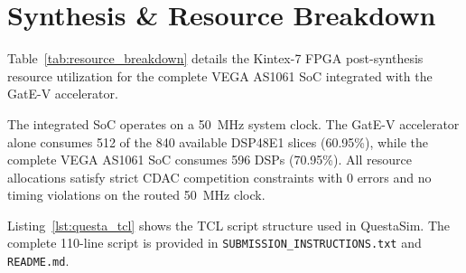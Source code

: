\documentclass[10pt,journal,compsoc,twocolumn]{IEEEtran}
\begin{document}
\newpage

\section{Synthesis \& Resource Breakdown}
Table~\ref{tab:resource_breakdown} details the Kintex-7 FPGA post-synthesis resource utilization for the complete VEGA AS1061 SoC integrated with the GatE-V accelerator.

\begin{table}[htbp]
\caption{Kintex-7 (\texttt{xc7k325tffg900-2}) Resource Utilization}
\label{tab:resource_breakdown}
\centering
{}
\end{table}

The integrated SoC operates on a 50~MHz system clock. The GatE-V accelerator alone consumes 512 of the 840 available DSP48E1 slices (60.95\%), while the complete VEGA AS1061 SoC consumes 596 DSPs (70.95\%). All resource allocations satisfy strict CDAC competition constraints with 0 errors and no timing violations on the routed 50~MHz clock.

Listing~\ref{lst:questa_tcl} shows the TCL script structure used in QuestaSim. The complete 110-line script is provided in \texttt{SUBMISSION\_INSTRUCTIONS.txt} and \texttt{README.md}.
\end{document}
